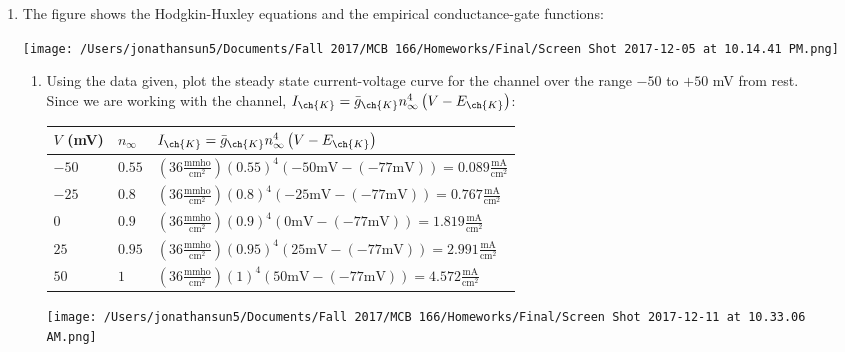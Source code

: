 \documentclass[11pt]{article}
\begin{document}
\begin{enumerate}[label=\arabic*.]
\newpage
\item
The figure shows the Hodgkin-Huxley equations and the empirical conductance-gate functions:
\begin{center}
\texttt{[image: /Users/jonathansun5/Documents/Fall 2017/MCB 166/Homeworks/Final/Screen Shot 2017-12-05 at 10.14.41 PM.png]}
\end{center}
\begin{enumerate}[label=(\alph*)]
\item
Using the data given, plot the steady state current-voltage curve for the  channel over the range $-50$ to $+50$ mV from rest.
\vspace*{1\baselineskip}
\\
Since we are working with the  channel, $I_{\ch{K}} = \bar{g}_{\ch{K}} n_{\infty}^4 \left(V - E_{\ch{K}}\right)$:
\begin{center}
\begin{tabular}{ l | l | l }
$V$ (mV) & $n_{\infty}$ & $I_{\ch{K}} = \bar{g}_{\ch{K}} n_{\infty}^4 \left(V - E_{\ch{K}}\right)$ \\[0.125cm]
\hline
$-50$ & $0.55$ & $\left(36 \frac{\text{mmho}} {\text{cm}^2}\right) \left(0.55\right)^4 \left(-50 \text{mV} - (-77 \text{mV})\right) = 0.089 \frac{\text{mA}} {\text{cm}^2}$ \\[0.25cm]
$-25$ & $0.8$ & $\left(36 \frac{\text{mmho}} {\text{cm}^2}\right) \left(0.8\right)^4 \left(-25 \text{mV} - (-77 \text{mV})\right) = 0.767 \frac{\text{mA}} {\text{cm}^2}$ \\[0.25cm]
$0$ & $0.9$ & $\left(36 \frac{\text{mmho}} {\text{cm}^2}\right) \left(0.9\right)^4 \left(0 \text{mV} - (-77 \text{mV})\right) = 1.819 \frac{\text{mA}} {\text{cm}^2}$ \\[0.25cm]
$25$ & $0.95$ & $\left(36 \frac{\text{mmho}} {\text{cm}^2}\right) \left(0.95\right)^4 \left(25 \text{mV} - (-77 \text{mV})\right) = 2.991 \frac{\text{mA}} {\text{cm}^2}$ \\[0.25cm]
$50$ & $1$ & $\left(36 \frac{\text{mmho}} {\text{cm}^2}\right) \left(1\right)^4 \left(50 \text{mV} - (-77 \text{mV})\right) = 4.572 \frac{\text{mA}} {\text{cm}^2}$ \\[0.25cm]
\end{tabular}
\end{center}
\begin{center}
\texttt{[image: /Users/jonathansun5/Documents/Fall 2017/MCB 166/Homeworks/Final/Screen Shot 2017-12-11 at 10.33.06 AM.png]}
\end{center}




\end{enumerate}
\end{enumerate}
\end{document}
